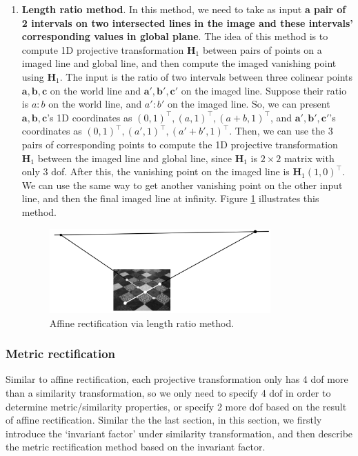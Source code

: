 \documentclass[12pt]{article}
\numberwithin{equation}{section}
\begin{document}
\begin{enumerate}
\item \textbf{Length ratio method}. In this method, we need to take as input \textbf{a pair of 2 intervals on two intersected lines in the image and these intervals' corresponding values in global plane}. The idea of this method is to compute 1D projective transformation $\mathbf{H}_1$ between pairs of points on a imaged line and global line, and then compute the imaged vanishing point using $\mathbf{H}_1$. The input is the ratio of two intervals between three colinear points $\mathbf{a,b,c}$ on the world line and $\mathbf{a',b',c'}$ on the imaged line. Suppose their ratio is $a : b$ on the world line, and $a' : b'$ on the imaged line. So, we can present $\mathbf{a,b,c}$'s 1D coordinates as $(0, 1)^\top, (a, 1)^\top, (a + b, 1)^\top$, and $\mathbf{a',b',c'}$'s coordinates as $(0, 1)^\top, (a', 1)^\top, (a' + b', 1)^\top$. Then, we can use the 3 pairs of corresponding points to compute the 1D projective transformation $\mathbf{H}_1$ between the imaged line and global line, since $\mathbf{H}_1$ is $2\times 2$ matrix with only 3 dof. After this, the vanishing point on the imaged line is $\mathbf{H}_1 (1, 0)^\top$. We can use the same way to get another vanishing point on the other input line, and then the final imaged line at infinity. Figure \ref{fig:affine_rect_lengthratio} illustrates this method.

\begin{figure}[h]
\begin{center}
\includegraphics[width=0.8\textwidth]{affine_rect03.png}
\end{center}
\caption{Affine rectification via length ratio method.}
\label{fig:affine_rect_lengthratio}
\end{figure}

\end{enumerate}

\subsubsection{Metric rectification}
\label{sec:metric_rect}

Similar to affine rectification, each projective transformation only has 4 dof more than a similarity transformation, so we only need to specify 4 dof in order to determine metric/similarity properties, or specify 2 more dof based on the result of affine rectification. Similar the the last section, in this section, we firstly introduce the `invariant factor' under similarity transformation, and then describe the metric rectification method based on the invariant factor.
\end{document}
